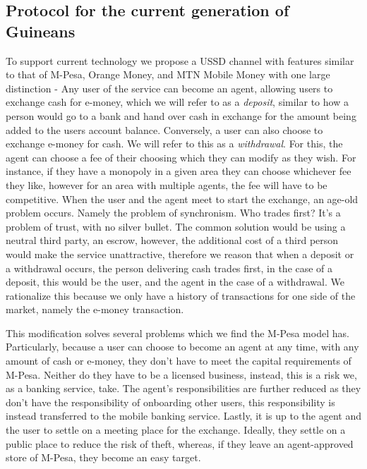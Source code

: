 \documentclass[11pt, a4paper]{article}
\begin{document}
\subsection{Protocol for the current generation of Guineans}
To support current technology we propose a USSD channel with features similar to that of M-Pesa, Orange Money, and MTN Mobile Money with one large distinction - Any user of the service can become an agent, allowing users to exchange cash for e-money, which we will refer to as a \textit{deposit}, similar to how a person would go to a bank and hand over cash in exchange for the amount being added to the users account balance. Conversely, a user can also choose to exchange e-money for cash. We will refer to this as a \textit{withdrawal}. For this, the agent can choose a fee of their choosing which they can modify as they wish. For instance, if they have a monopoly in a given area they can choose whichever fee they like, however for an area with multiple agents, the fee will have to be competitive. When the user and the agent meet to start the exchange, an age-old problem occurs. Namely the problem of synchronism. Who trades first? It's a problem of trust, with no silver bullet. The common solution would be using a neutral third party, an escrow, however, the additional cost of a third person would make the service unattractive, therefore we reason that when a deposit or a withdrawal occurs, the person delivering cash trades first, in the case of a deposit, this would be the user, and the agent in the case of a withdrawal. We rationalize this because we only have a history of transactions for one side of the market, namely the e-money transaction.

This modification solves several problems which we find the M-Pesa model has. Particularly, because a user can choose to become an agent at any time, with any amount of cash or e-money, they don't have to meet the capital requirements of M-Pesa. Neither do they have to be a licensed business, instead, this is a risk we, as a banking service, take. The agent's responsibilities are further reduced as they don't have the responsibility of onboarding other users, this responsibility is instead transferred to the mobile banking service. Lastly, it is up to the agent and the user to settle on a meeting place for the exchange. Ideally, they settle on a public place to reduce the risk of theft, whereas, if they leave an agent-approved store of M-Pesa, they become an easy target.
\end{document}
